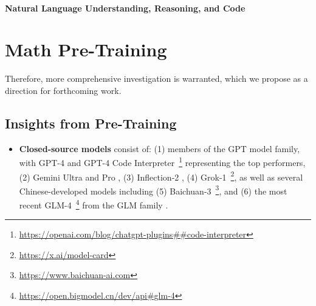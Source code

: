 {\begin{itemize}[topsep=0pt]
\paragraph{Natural Language Understanding, Reasoning, and Code}

\section{Math Pre-Training}

Therefore, more comprehensive investigation is warranted, which we propose as a direction for forthcoming work.

\subsection{Insights from Pre-Training}


\begin{abstract}
The intricacies and systematic characteristics of mathematical reasoning present notable obstacles for language models. This work presents DeepSeekMath~7B, which extends the pre-training of DeepSeek-Coder-Base-v1.5 7B by incorporating 120B mathematics-focused tokens, gathered from Common Crawl alongside data comprising both natural language and code. Remarkably, DeepSeekMath~7B secures a 51.7\% score on the competitive MATH benchmark, managing this without dependence on supplementary toolkits or ensemble voting methods, thus nearing the achievements of models like Gemini-Ultra and GPT-4. When employing self-consistency across 64 outputs, DeepSeekMath~7B attains 60.9\% on the MATH benchmark. The advanced mathematical reasoning exhibited by DeepSeekMath~can be ascribed to two principal factors: Firstly, a rigorously constructed data curation pipeline effectively utilizes substantial volumes of publicly available web data. Secondly, a newly proposed algorithm, Group Relative Policy Optimization (GRPO)—a modified version of Proximal Policy Optimization (PPO)—bolsters mathematical reasoning while also refining PPO's memory efficiency.
\end{abstract}

\begin{itemize}[topsep=0pt]
    \item \textbf{Closed-source models} consist of: (1) members of the GPT model family, with GPT-4 \citep{gpt4} and GPT-4 Code Interpreter~\footnote{\url{https://openai.com/blog/chatgpt-plugins\#\#code-interpreter}} representing the top performers, (2) Gemini Ultra and Pro \citep{gemini}, (3) Inflection-2 \citep{inflection-2}, (4) Grok-1~\footnote{\url{https://x.ai/model-card}}, as well as several Chinese-developed models including (5) Baichuan-3~\footnote{\url{https://www.baichuan-ai.com}}, and (6) the most recent GLM-4~\footnote{\url{https://open.bigmodel.cn/dev/api\#glm-4}} from the GLM family \citep{glm}.
\end{itemize}


\end{itemize}}
